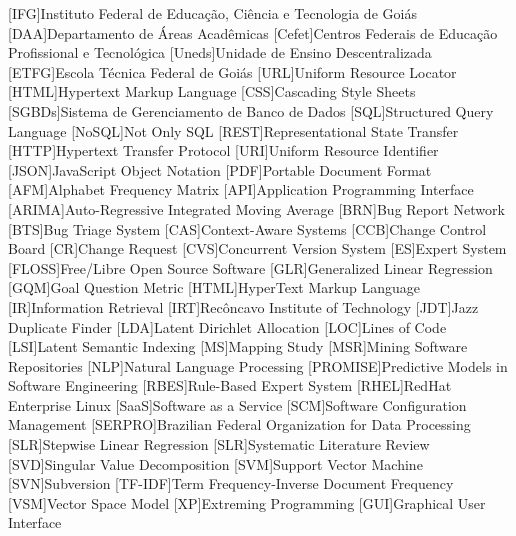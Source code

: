 \begin{acronym}[ACRONYM] 
[IFG]{Instituto Federal de Educação, Ciência e Tecnologia de Goiás}
[DAA]{Departamento de Áreas Acadêmicas}
[Cefet]{Centros Federais de Educação Profissional e Tecnológica}
[Uneds]{Unidade de Ensino Descentralizada}
[ETFG]{Escola Técnica Federal de Goiás}
[URL]{Uniform Resource Locator}
[HTML]{Hypertext Markup Language}
[CSS]{Cascading Style Sheets}
[SGBDs]{Sistema de Gerenciamento de Banco de Dados}
[SQL]{Structured Query Language}
[NoSQL]{Not Only SQL}
[REST]{Representational State Transfer}
[HTTP]{Hypertext Transfer Protocol}
[URI]{Uniform Resource Identifier}
[JSON]{JavaScript Object Notation}
[PDF]{Portable Document Format}
[AFM]{Alphabet Frequency Matrix}
[API]{Application Programming Interface}
[ARIMA]{Auto-Regressive Integrated Moving Average}
[BRN]{Bug Report Network}
[BTS]{Bug Triage System}
[CAS]{Context-Aware Systems}
[CCB]{Change Control Board}
[CR]{Change Request}
[CVS]{Concurrent Version System}
[ES]{Expert System}
[FLOSS]{Free/Libre Open Source Software}
[GLR]{Generalized Linear Regression}
[GQM]{Goal Question Metric}
[HTML]{HyperText Markup Language}
[IR]{Information Retrieval}
[IRT]{Recôncavo Institute of Technology}
[JDT]{Jazz Duplicate Finder}
[LDA]{Latent Dirichlet Allocation}
[LOC]{Lines of Code}
[LSI]{Latent Semantic Indexing}
[MS]{Mapping Study}
[MSR]{Mining Software Repositories}
[NLP]{Natural Language Processing}
[PROMISE]{Predictive Models in Software Engineering}
[RBES]{Rule-Based Expert System}
[RHEL]{RedHat Enterprise Linux}
[SaaS]{Software as a Service}
[SCM]{Software Configuration Management}
[SERPRO]{Brazilian Federal Organization for Data Processing}
[SLR]{Stepwise Linear Regression}
[SLR]{Systematic Literature Review}
[SVD]{Singular Value Decomposition}
[SVM]{Support Vector Machine}
[SVN]{Subversion}
[TF-IDF]{Term Frequency-Inverse Document Frequency}
[VSM]{Vector Space Model}
[XP]{Extreming Programming}
[GUI]{Graphical User Interface}
\end{acronym}